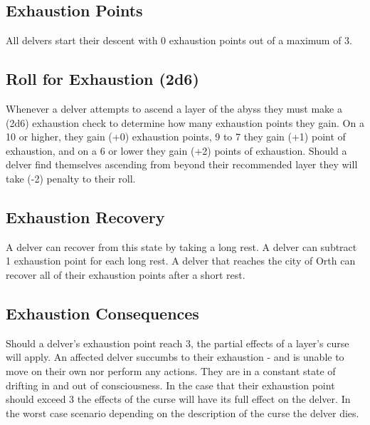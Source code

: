 \documentclass[letterpaper,10pt,twoside,twocolumn,openany]{book}
\begin{document}
\subsection{Exhaustion Points}
{All delvers start their descent with 0 exhaustion points out of a maximum of 3.}

\subsection{Roll for Exhaustion (2d6)}
{Whenever a delver attempts to ascend a layer of the abyss they must make a (2d6) exhaustion check to determine how many exhaustion points they gain. On a 10 or higher, they gain (+0) exhaustion points, 9 to 7 they gain (+1) point of exhaustion, and on a 6 or lower they gain (+2) points of exhaustion. \newline Should a delver find themselves ascending from beyond their recommended layer they will take (-2) penalty to their roll.}

\subsection{Exhaustion Recovery}
{A delver can recover from this state by taking a long rest. A delver can subtract 1 exhaustion point for each long rest. A delver that reaches the city of Orth can recover all of their exhaustion points after a short rest.}

\subsection{Exhaustion Consequences}
{Should a delver's exhaustion point reach 3, the partial effects of a layer's curse will apply. An affected delver succumbs to their exhaustion - and is unable to move on their own nor perform any actions. They are in a constant state of drifting in and out of consciousness. \newline In the case that their exhaustion point should exceed 3 the effects of the curse will have its full effect on the delver. In the worst case scenario depending on the description of the curse the delver dies.}
\end{document}

